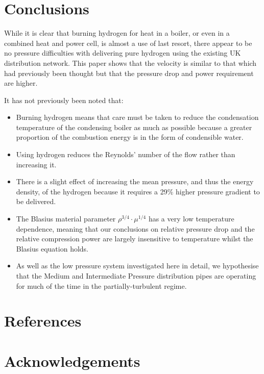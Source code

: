 \documentclass[5p]{elsarticle} %
\begin{document}
\section{Conclusions}
\label{sec:conc}

While it is clear that burning hydrogen for heat in a boiler, or even in a combined heat and power cell, is almost a use of last resort\citep{Rosenow2024,Liebreich2021}, there appear to be no pressure difficulties with delivering pure hydrogen using the existing UK distribution network. This paper shows that the velocity is similar to that which had previously been thought but that the pressure drop and power requirement are higher.

It has not previously been noted that:
\begin{itemize}

    \item Burning hydrogen means that care must be taken to reduce the condensation temperature of the condensing boiler as much as possible because a greater proportion of the combustion energy is in the form of condensible water.
    \item Using hydrogen reduces the Reynolds' number of the flow rather than increasing it.  
    \item There is a slight effect of increasing the mean pressure, and thus the energy density, of the hydrogen because it requires a 29\% higher pressure gradient to be delivered.
    \item The Blasius material parameter $\rho^{3/4} \cdot \mu^{1/4}$ has a very low temperature dependence, meaning that our conclusions on relative pressure drop and the relative compression power are largely insensitive to temperature whilst the Blasius equation holds.
    \item As well as the low pressure system investigated here in detail, we hypothesise that the Medium and Intermediate Pressure distribution pipes are operating for much of the time in the partially-turbulent regime.
\end{itemize}

\section{References}



\section*{Acknowledgements}
\label{sec:ending}
\end{document}
